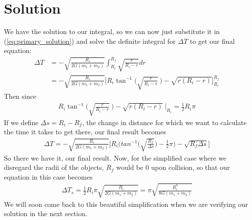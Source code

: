 \documentclass{article}
\begin{document}
\section{Solution}
We have the solution to our integral, so we can now just substitute it in (\ref{eq:primary_solution}) and solve the definite integral for $\Delta T$ to get our final equation:
\begin{align}
\Delta T &=  - \sqrt{\frac{R_i}{2G(m_1 + m_2)}} \int_{R_i}^{R_f} \sqrt{\frac{r}{R_i - r}} dr\\
&=   - \sqrt{\frac{R_i}{2G(m_1 + m_2)}} \biggl[  R_i \tan^{-1}\biggl(\sqrt{\frac{r}{R_i - r}} ~ \biggr) -\sqrt{r( R_i - r)} \biggr]_{R_i}^{R_f}
\end{align}
Then since
\begin{align}
     R_i \tan^{-1}\biggl(\sqrt{\frac{r}{R_i - r}} ~ \biggr) -\sqrt{r( R_i - r)} ~ \bigg|_{R_i} = \frac{1}{2} R_i \pi
\end{align}
If we define $\Delta s = R_i - R_f$, the change in distance for which we want to calculate the time it takes to get there, our final result becomes
\begin{align}
    \Delta T =  - \sqrt{\frac{R_i}{2G(m_1 + m_2)}} \biggl[ R_i \biggl( tan^{-1}\biggl(\sqrt{\frac{R_f}{ \Delta s}}\biggr) - \frac{1}{2}\pi \biggr) - \sqrt{R_f \Delta s } \biggr]
\end{align}
So there we have it, our final result. Now, for the simplified case where we disregard the radii of the objects, $R_f$ would be $0$ upon collision, so that our equation in this case becomes
\begin{align}
    \label{eq:simplified_kepler}
    \Delta T_{s} =  \frac{1}{2} R_i \pi \sqrt{\frac{R_i}{2G(m_1 + m_2)}} = \pi \sqrt{\frac{R_i^3}{8G(m_1 + m_2)}}
\end{align}
We will soon come back to this beautiful simplification when we are verifying our solution in the next section.
\end{document}
